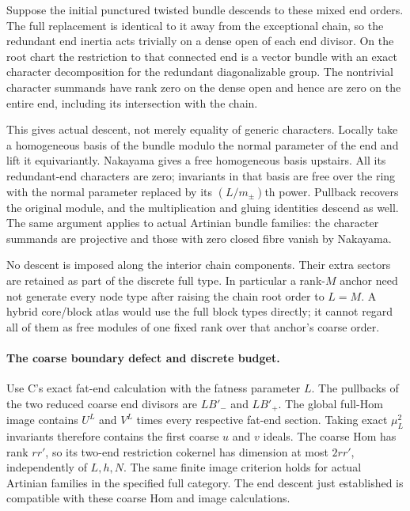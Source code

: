 Suppose the initial punctured twisted bundle descends to these mixed
end orders.  The full replacement is identical to it away from the
exceptional chain, so the redundant end inertia acts trivially on a
dense open of each end divisor.  On the root chart the restriction to
that connected end is a vector bundle with an exact character
decomposition for the redundant diagonalizable group.  The nontrivial
character summands have rank zero on the dense open and hence are
zero on the entire end, including its intersection with the chain.

This gives actual descent, not merely equality of generic characters.
Locally take a homogeneous basis of the bundle modulo the normal
parameter of the end and lift it equivariantly.  Nakayama gives a free
homogeneous basis upstairs.  All its redundant-end characters are
zero; invariants in that basis are free over the ring with the normal
parameter replaced by its $(L/m_\pm)$th power.  Pullback recovers the
original module, and the multiplication and gluing identities descend
as well.  The same argument applies to actual Artinian bundle families:
the character summands are projective and those with zero closed fibre
vanish by Nakayama.

No descent is imposed along the interior chain components.  Their
extra sectors are retained as part of the discrete full type.  In
particular a rank-$M$ anchor need not generate every node type after
raising the chain root order to $L=M$.  A hybrid core/block atlas
would use the full block types directly; it cannot regard all of them
as free modules of one fixed rank over that anchor's coarse order.

\paragraph{The coarse boundary defect and discrete budget.}
Use C's exact fat-end calculation with the fatness parameter $L$.
The pullbacks of the two reduced coarse end divisors are $LB'_-$ and
$LB'_+$.  The global full-Hom image contains $U^L$ and $V^L$ times
every respective fat-end section.  Taking exact $\mu_L^2$ invariants
therefore contains the first coarse $u$ and $v$ ideals.  The coarse
Hom has rank $rr'$, so its two-end restriction cokernel has dimension
at most $2rr'$, independently of $L,h,N$.  The same finite image
criterion holds for actual Artinian families in the specified full
category.  The end descent just established is compatible with these
coarse Hom and image calculations.

